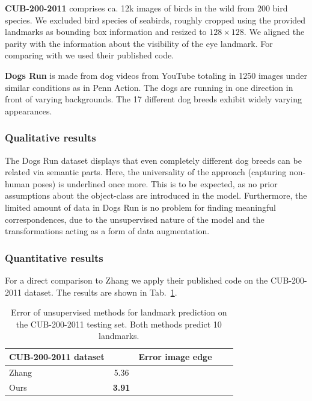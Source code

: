 
		\begin{tcolorbox}
			\textbf{CUB-200-2011} \cite{wah11birds} comprises ca. 12k images of birds in the wild from 200 bird species.
			We excluded bird species of seabirds, roughly cropped using the provided landmarks as bounding box information and resized to $128\times128$.
			We aligned the parity with the information about the visibility of the eye landmark.
			For comparing with \cite{zhang18} we used their published code.
		\end{tcolorbox}
		\begin{tcolorbox}
			\textbf{Dogs Run} is made from dog videos from YouTube totaling in 1250 images under similar conditions as in Penn Action. The dogs are running in one direction in front of varying backgrounds. The 17 different dog breeds exhibit widely varying appearances.
		\end{tcolorbox}

		\subsubsection{Qualitative results}
			The Dogs Run dataset displays that even completely different dog breeds can be related via semantic parts.
			Here, the universality of the approach (capturing non-human poses) is underlined once more.
			This is to be expected, as no prior assumptions about the object-class are introduced in the model.
			Furthermore, the limited amount of data in Dogs Run is no problem for finding meaningful correspondences, due to the unsupervised nature of the model and the transformations acting as a form of data augmentation.

		\subsubsection{Quantitative results}

			For a direct comparison to Zhang \etal \cite{zhang18} we apply their published code on the CUB-200-2011 dataset. The results are shown in Tab.~\ref{tab:birds}.

			\begin{table}[t]
				\caption{Error of unsupervised methods for landmark prediction on the CUB-200-2011 testing set. Both methods predict 10 landmarks.}
				\label{tab:birds}
				\centering
				\begin{tabular}{l|cccc}
					\hline
					CUB-200-2011 dataset&  & Error \wrt image edge\\
					\hline
					Zhang \cite{zhang18} & 5.36 \\
					Ours  & \textbf{3.91}  \\ \hline
				\end{tabular}
			\end{table}


